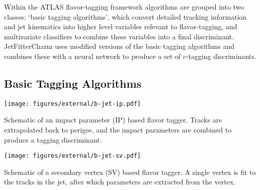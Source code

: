 Within the ATLAS flavor-tagging framework algorithms are grouped into two classes: `basic tagging algorithms', which convert detailed tracking information and jet kinematics into higher level variables relevant to flavor-tagging, and multivariate classifiers to combine these variables into a final discriminant.  JetFitterCharm uses modified versions of the basic tagging algorithms and combines these with a neural network to produce a set of $c$-tagging discriminants.


\subsection{Basic Tagging Algorithms}

\newcommand{\jfsignote}{The total significance of JetFitter vertices is computed as $S_{d}^{\rm JF} = (\sum_i L_{i} / \sigma^2_i )\big/(\sum_i 1 / \sigma^2_i)^{1/2}$,
where $i$ indexes the tracks, $L$ is the vertex displacement, and $\sigma$ is the vertex displacement uncertainty.}

\begin{cfig}
  \texttt{[image: figures/external/b-jet-ip.pdf]}
  \caption[Impact parameter based flavor-tagging]{Schematic of an impact parameter (IP) based flavor tagger. Tracks are extrapolated back to perigee, and the impact parameters are combined to produce a tagging discriminant.}
  \label{fig:b-jet-ip}
\end{cfig}

\begin{cfig}
  \texttt{[image: figures/external/b-jet-sv.pdf]}
  \caption[Secondary vertex based flavor-tagging]{Schematic of a secondary vertex (SV) based flavor tagger. A single vertex is fit to the tracks in the jet, after which parameters are extracted from the vertex.}
  \label{fig:b-jet-sv}
\end{cfig}

